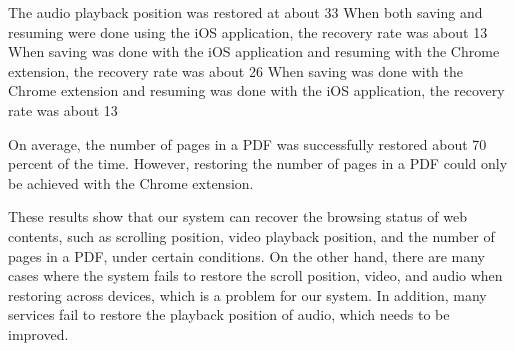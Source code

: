 \begin{eabstract}
The audio playback position was restored at about 33%
When both saving and resuming were done using the iOS application, the recovery rate was about 13%
When saving was done with the iOS application and resuming with the Chrome extension, the recovery rate was about 26%
When saving was done with the Chrome extension and resuming was done with the iOS application, the recovery rate was about 13%

On average, the number of pages in a PDF was successfully restored about 70 percent of the time.
However, restoring the number of pages in a PDF could only be achieved with the Chrome extension.

  These results show that our system can recover the browsing status of web contents, such as scrolling position, video playback position, and the number of pages in a PDF, under certain conditions.
  On the other hand, there are many cases where the system fails to restore the scroll position, video, and audio when restoring across devices, which is a problem for our system.
  In addition, many services fail to restore the playback position of audio, which needs to be improved.

\end{eabstract}
